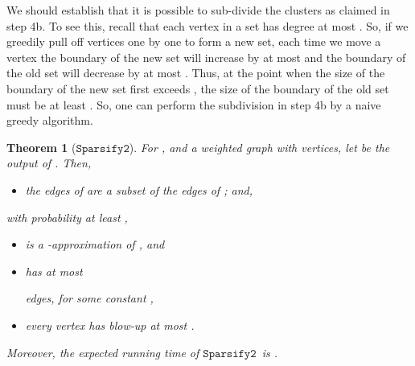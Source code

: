 \documentclass[11pt]{article}
\newtheorem{theorem}{Theorem}[section]
\newcommand{\sparsifytwo}{\ensuremath{\mathtt{Sparsify2}}}
\begin{document}
\vskip 0.2in
\noindent
{}
\vskip 0.2in

We should establish that it is possible to sub-divide the clusters
  as claimed in step 4b.
To see this, recall that each vertex in a set 
  has degree at most .
So, if we greedily pull off vertices one by one to form a new set, each time we
  move a vertex the boundary of the new set will increase by at most
   and the boundary of the old set will decrease by at most
  .
Thus, at the point when the size of the boundary of the new set
  first exceeds , the size of the boundary of the old set must
  be at least .
So, one can perform the subdivision in step 4b by a naive greedy algorithm.

\begin{theorem}[\sparsifytwo]\label{thm:sparsifytwo}
For ,  and a weighted graph 
  with  vertices, let
 be the output of .
Then,
\begin{itemize}
\item [(Y.1)] the edges of  are a subset of the edges of ; and,
\end{itemize}
with probability at least ,
\begin{itemize}
\item [(Y.2)]  is a -approximation of , and
\item [(Y.3)]  has at most
  
  edges, for some constant ,
\item [(Y.4)] every vertex has blow-up at most .
\end{itemize}
Moreover, the expected running time of \sparsifytwo  \ is 
  .
\end{theorem}
\end{document}

